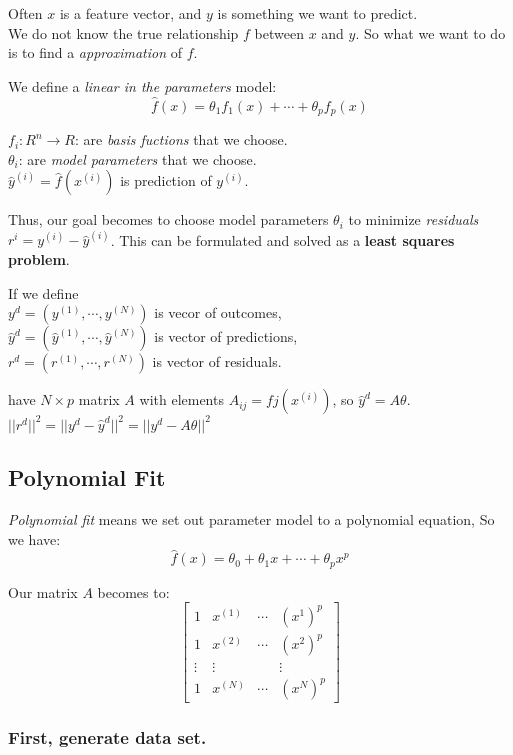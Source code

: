 \documentclass[11pt]{article}
\begin{document}
Often \(x\) is a feature vector, and \(y\) is something we want to
predict.\\
We do not know the true relationship \(f\) between \(x\) and \(y\). So
what we want to do is to find a \emph{approximation} of \(f\).

We define a \emph{linear in the parameters} model:
\[\hat{f}(x) = \theta_{1}f_{1}(x)+ \cdots + \theta_{p}f_{p}(x)\]

\(f_{i}: R^{n} \rightarrow R\): are \emph{basis fuctions} that we
choose.\\
\(\theta_{i}\): are \emph{model parameters} that we choose.\\
\(\hat{y}^{(i)} = \hat{f}(x^{(i)})\) is prediction of \(y^(i)\).

Thus, our goal becomes to choose model parameters \(\theta_{i}\) to
minimize \emph{residuals} \(r^{i} = y^{(i)} - \hat{y}^{(i)}\). This can
be formulated and solved as a \textbf{least squares problem}.

If we define\\
\(y^{d} = (y^{(1)},\cdots,y^{(N)})\) is vecor of outcomes,\\
\(\hat{y}^{d} = (\hat{y}^{(1)},\cdots,\hat{y}^{(N)})\) is vector of
predictions,\\
\(r^{d} = (r^{(1)},\cdots,r^{(N)})\) is vector of residuals.

have \(N\times p\) matrix \(A\) with elements
\(A_{ij} = f{j}(x^{(i)})\), so \(\hat{y}^{d} = A\theta\).\\
\(||r^{d}||^2 = ||y^{d} - \hat{y}^{d}||^2 = ||y^{d} - A\theta||^2\)

    \subsection{Polynomial Fit}\label{polynomial-fit}

\emph{Polynomial fit} means we set out parameter model to a polynomial
equation, So we have:
\[\hat{f}(x) = \theta_{0} + \theta_{1}x + \cdots + \theta_{p}x^{p}\]

Our matrix \(A\) becomes to: \[\begin{bmatrix}
    1 & x^{(1)} & \cdots & (x^{1})^{p}\\
    1 & x^{(2)} & \cdots & (x^{2})^{p}\\
    \vdots & \vdots & & \vdots \\
    1 & x^{(N)} & \cdots & (x^{N})^{p}
\end{bmatrix}\]

    \subsubsection{First, generate data
set.}\label{first-generate-data-set.}
\end{document}
